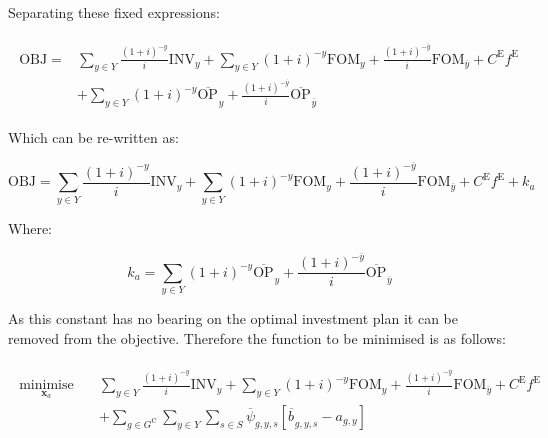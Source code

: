 \documentclass{article}
\newcommand{\sGeneratorsCandidate}{G^{\mathrm{C}}}
\newcommand{\sYears}{Y}
\newcommand{\sScenarios}{S}
\newcommand{\iGenerator}{g}
\newcommand{\iYear}{y}
\newcommand{\iYearTerminal}{\overline{\iYear}}
\newcommand{\iScenario}{s}
\newcommand{\cOperatingCost}[1][\iYear,\iScenario]{\mathrm{OP}_{#1}}
\newcommand{\cFixedOperationsMaintenanceCost}[1][\iGenerator]{\mathrm{FOM}_{#1}}
\newcommand{\cInvestmentCost}[1][\iYear]{\mathrm{INV}_{#1}}
\newcommand{\cInterestRate}{i}
\newcommand{\cEmissionsTargetViolationPenalty}{C^{\mathrm{E}}}
\newcommand{\cObjectiveFunction}{\mathrm{OBJ}}
\newcommand{\vEmissionsTargetViolation}{f^{\mathrm{E}}}
\newcommand{\vInstalledCapacityTotal}[1][\iGenerator,\iYear]{a_{#1}}
\newcommand{\vInstalledCapacityTotalScenario}[1][\iGenerator,\iYear,\iScenario]{b_{#1}}
\DeclareMathOperator*{\minimise}{minimise}
\begin{document}
Separating these fixed expressions:

\begin{align}
	\begin{split}
		\cObjectiveFunction = &\sum\limits_{\iYear \in \sYears} \frac{(1+\cInterestRate)^{-\iYear}}{\cInterestRate}\cInvestmentCost + \sum\limits_{\iYear \in \sYears} (1+\cInterestRate)^{-\iYear} \cFixedOperationsMaintenanceCost[\iYear]  + \frac{(1+\cInterestRate)^{-\iYearTerminal}}{\cInterestRate} \cFixedOperationsMaintenanceCost[\iYearTerminal] + \cEmissionsTargetViolationPenalty \vEmissionsTargetViolation\\
		& + \sum\limits_{\iYear \in \sYears} (1+\cInterestRate)^{-\iYear} \overline{\cOperatingCost[]}_{\iYear} + \frac{(1+\cInterestRate)^{-\iYearTerminal}}{\cInterestRate} \overline{\cOperatingCost[]}_{\iYearTerminal}
	\end{split}
\end{align}

Which can be re-written as:

\begin{equation}
	\cObjectiveFunction = \sum\limits_{\iYear \in \sYears} \frac{(1+\cInterestRate)^{-\iYear}}{\cInterestRate}\cInvestmentCost + \sum\limits_{\iYear \in \sYears} (1+\cInterestRate)^{-\iYear} \cFixedOperationsMaintenanceCost[\iYear]  + \frac{(1+\cInterestRate)^{-\iYearTerminal}}{\cInterestRate} \cFixedOperationsMaintenanceCost[\iYearTerminal] + \cEmissionsTargetViolationPenalty \vEmissionsTargetViolation + k_{a}
\end{equation}

Where:

\begin{equation}
	k_{a} = \sum\limits_{\iYear \in \sYears} (1+\cInterestRate)^{-\iYear} \overline{\cOperatingCost[]}_{\iYear} + \frac{(1+\cInterestRate)^{-\iYearTerminal}}{\cInterestRate} \overline{\cOperatingCost[]}_{\iYearTerminal}
\end{equation}

As this constant has no bearing on the optimal investment plan it can be removed from the objective. Therefore the function to be minimised is as follows:

\begin{align}
	\begin{split}
		\minimise\limits_{\bm{x}_{a}} \quad & \sum\limits_{\iYear \in \sYears} \frac{(1+\cInterestRate)^{-\iYear}}{\cInterestRate}\cInvestmentCost + \sum\limits_{\iYear \in \sYears} (1+\cInterestRate)^{-\iYear} \cFixedOperationsMaintenanceCost[\iYear]  + \frac{(1+\cInterestRate)^{-\iYearTerminal}}{\cInterestRate} \cFixedOperationsMaintenanceCost[\iYearTerminal] + \cEmissionsTargetViolationPenalty \vEmissionsTargetViolation\\
		& + \sum\limits_{\iGenerator \in \sGeneratorsCandidate}\sum\limits_{\iYear \in \sYears}\sum\limits_{\iScenario \in \sScenarios} \overline{\psi}_{\iGenerator,\iYear,\iScenario}\left[\overline{\vInstalledCapacityTotalScenario[]}_{\iGenerator,\iYear,\iScenario} - \vInstalledCapacityTotal\right]
	\end{split}
\end{align}
\end{document}
